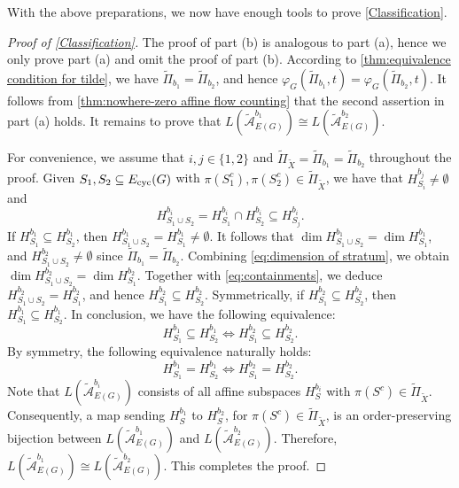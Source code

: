 \documentclass[12pt]{article}%
\renewcommand*{\bm}[1]{#1}%
\numberwithin{equation}{section}
\begin{document}
With the above preparations, we now have enough tools to prove \autoref{Classification}.
\begin{proof}[Proof of \autoref{Classification}]
The proof of part (b) is analogous to part (a), hence we only prove part (a) and omit the proof of part (b). According to \autoref{thm:equivalence condition for tilde}, we have $\tilde{\Pi}_{\bm b_1}=\tilde{\Pi}_{\bm b_2}$, and hence $\varphi_G(\tilde{\Pi}_{\bm b_1},t)=\varphi_G(\tilde{\Pi}_{\bm b_2},t)$. It follows from \autoref{thm:nowhere-zero affine flow counting} that the second assertion in part (a) holds. It remains to prove that $L(\tilde{\mathcal{A}}_{E(G)}^{\bm b_1})\cong L(\tilde{\mathcal{A}}_{E(G)}^{\bm b_2})$.

For convenience, we assume that $i,j\in\{1,2\}$ and $\tilde{\Pi}_{\tilde{X}}=\tilde{\Pi}_{\bm b_1}=\tilde{\Pi}_{\bm b_2}$  throughout the proof. Given $S_1,S_2\subseteq E_{\rm cyc}(G)$ with $\pi(S_1^c),\pi(S_2^c)\in\tilde{\Pi}_{\tilde{X}}$, we have that $H_{S_i}^{\bm b_j}\neq\emptyset$ and 
\begin{equation}\label{eq:containments}
H^{\bm b_i}_{S_1\cup S_2}=H^{\bm b_i}_{S_1}\cap H^{\bm b_i}_{S_2}\subseteq H^{\bm b_i}_{S_j}.
\end{equation}
If $H^{\bm b_1}_{S_1}\subseteq H^{\bm b_1}_{S_2}$, then $H^{\bm b_1}_{S_1\cup S_2}=H^{\bm b_1}_{S_1}\neq\emptyset$. It follows that $\dim H^{\bm b_1}_{S_1\cup S_2}=\dim H^{\bm b_1}_{S_1}$, and $H^{\bm b_2}_{S_1\cup S_2}\neq\emptyset$ since $\tilde{\Pi}_{\bm b_1}=\tilde{\Pi}_{\bm b_2}$. Combining \eqref{eq:dimension of stratum}, we obtain $\dim H^{\bm b_2}_{S_1\cup S_2}=\dim H^{\bm b_2}_{S_1}$. Together with \eqref{eq:containments}, we deduce $H^{\bm b_2}_{S_1\cup S_2}=H^{\bm b_2}_{S_1}$, and hence $H^{\bm b_2}_{S_1}\subseteq H^{\bm b_2}_{S_2}$. Symmetrically, if $H^{\bm b_2}_{S_1}\subseteq H^{\bm b_2}_{S_2}$, then $H^{\bm b_1}_{S_1}\subseteq H^{\bm b_1}_{S_2}$. In conclusion, we have the following equivalence:
\[
H^{\bm b_1}_{S_1}\subseteq H^{\bm b_1}_{S_2}\iff H^{\bm b_2}_{S_1}\subseteq H^{\bm b_2}_{S_2}.
\]
By symmetry, the following equivalence naturally holds:
\[
H^{\bm b_1}_{S_1}=H^{\bm b_1}_{S_2}\iff H^{\bm b_2}_{S_1}=H^{\bm b_2}_{S_2}.
\]
Note that $L(\tilde{\mathcal{A}}_{E(G)}^{\bm b_i})$ consists of all affine subspaces $H_S^{\bm b_i}$ with $\pi(S^c)\in\tilde{\Pi}_{\tilde{X}}$. Consequently, a map sending $H^{\bm b_1}_S$ to $H^{\bm b_2}_S$, for $\pi(S^c)\in\tilde{\Pi}_{\tilde{X}}$, is an order-preserving bijection between $L(\tilde{\mathcal{A}}_{E(G)}^{\bm b_1})$ and $L(\tilde{\mathcal{A}}_{E(G)}^{\bm b_2})$. Therefore, $L(\tilde{\mathcal{A}}_{E(G)}^{\bm b_1})\cong L(\tilde{\mathcal{A}}_{E(G)}^{\bm b_2})$. This completes the proof.
\end{proof}
\end{document}
